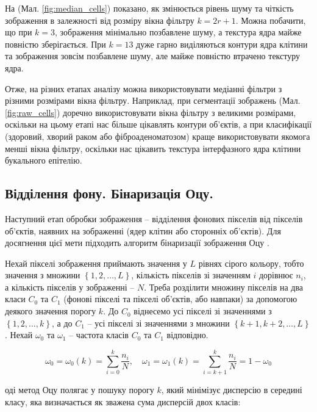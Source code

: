 На (Мал. \ref{fig:median_cells}) показано, як змінюється рівень шуму та чіткість зображення в залежності від розміру вікна фільтру \(k = 2r + 1\). Можна побачити, що при \(k = 3\), зображення мінімально позбавлене шуму, а текстура ядра майже повністю зберігається. При \(k = 13\) дуже гарно виділяються контури ядра клітини та зображення зовсім позбавлене шуму, але майже повністю втрачено текстуру ядра.

Отже, на різних етапах аналізу можна використовувати медіанні фільтри з різними розмірами вікна фільтру. Наприклад, при сегментації зображень (Мал. \ref{fig:raw_cells}) доречно використовувати вікна фільтру з великими розмірами, оскільки на цьому етапі нас більше цікавлять контури об'єктів, а при класифікації (здоровий, хворий раком або фіброаденоматозом) краще використовувати якомога менші вікна фільтру, оскільки нас цікавить текстура інтерфазного ядра клітини букального епітелію.


\subsection{Відділення фону. Бінаризація Оцу.}

\par
Наступний етап обробки зображення -- відділення фонових пікселів від пікселів об'єктів, наявних на зображенні (ядер клітин або сторонніх об'єктів). Для досягнення цієї мети підходить алгоритм бінаризації зображення Оцу \parencite{bib:otsu}. 

\par

Нехай пікселі зображення приймають значення у $L$ рівнях сірого кольору, тобто значення з множини $\left\{ 1, 2, \dots, L \right\}$, кількість пікселів зі значенням $i$ дорівнює $n_i$, а кількість пікселів у зображенні -- $N$. Треба розділити множину пікселів на два класи $C_0$ та $C_1$ (фонові пікселі та пікселі об'єктів, або навпаки) за допомогою деякого значення порогу $k$. До $C_0$ віднесемо усі пікселі зі значеннями з $\left\{ 1, 2, \dots, k \right\}$, а до $C_1$ -- усі пікселі зі значеннями з множини $\left\{ k+1, k+2, \dots, L \right\}$. Нехай $\omega_0$ та $\omega_1$ -- частота класів $C_0$ та $C_1$ відповідно.  

$$\omega_0 = \omega_0(k) = \sum_{i=0}^{k}{\frac{n_i}{N}}, \quad
\omega_1 = \omega_1(k) = \sum_{i=k+1}^{k}{\frac{n_i}{N}} = 1 - \omega_0$$

оді метод Оцу полягає у пошуку порогу $k$, який мінімізує дисперсію в середині класу, яка визначається як зважена сума дисперсій двох класів:

